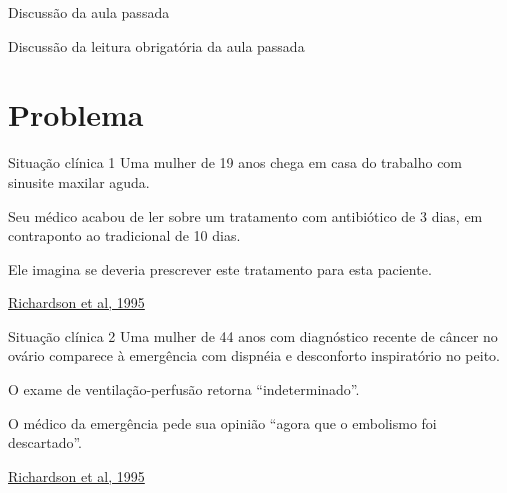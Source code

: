 \documentclass{beamer}
\begin{document}

\begin{frame}{Discussão da aula passada}
  \begin{block}{}
    Discussão da leitura obrigatória da aula passada
  \end{block}
\end{frame}

\section{Problema}



\begin{frame}
  \begin{exampleblock}{Situação clínica 1}
    \footnotesize
    Uma mulher de 19 anos chega em casa do trabalho com sinusite maxilar aguda.

    \bigskip
    Seu médico acabou de ler sobre um tratamento com antibiótico de 3 dias, em contraponto ao tradicional de 10 dias.

    \bigskip
    Ele imagina se deveria prescrever este tratamento para esta paciente.
  \end{exampleblock}

  \vfill
  \scriptsize
  \hfill \href{https://acpjc.acponline.org/Content/123/3/issue/ACPJC-1995-123-3-A12.htm}
      {Richardson et al, 1995}
\end{frame}

\begin{frame}
  \begin{exampleblock}{Situação clínica 2}
    \footnotesize
    Uma mulher de 44 anos com diagnóstico recente de câncer no ovário comparece à emergência com dispnéia e desconforto inspiratório no peito.

    \bigskip
    O exame de ventilação-perfusão retorna ``indeterminado''.

    \bigskip
    O médico da emergência pede sua opinião ``agora que o embolismo foi descartado''.
  \end{exampleblock}

  \vfill
  \scriptsize
  \hfill \href{https://acpjc.acponline.org/Content/123/3/issue/ACPJC-1995-123-3-A12.htm}
      {Richardson et al, 1995}
\end{frame}
\end{document}
